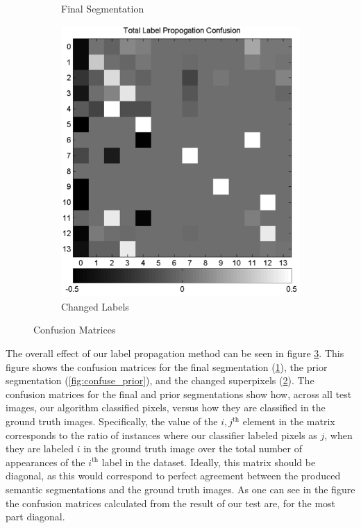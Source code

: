 \documentclass{article} %
\begin{document}
\begin{figure}[htb]
\begin{subfigure}[t]{0.33\textwidth}
		\parbox{0.95\textwidth}{\caption{Final Segmentation \label{fig:confuse_final}}}
	\end{subfigure}
	\begin{subfigure}[t]{0.33\textwidth}
		\centering
		\includegraphics[width = \textwidth]{./img/changeconfuse}
		\parbox{0.95\textwidth}{\caption{Changed Labels \label{fig:confuse_change}}}
	\end{subfigure}
	\caption{Confusion Matrices}
	\label{fig:confuse}
\end{figure}

The overall effect of our label propagation method can be seen in figure \ref{fig:confuse}. This figure shows the confusion matrices for the final segmentation (\ref{fig:confuse_final}), the prior segmentation (\ref{fig:confuse_prior}), and the changed superpixels (\ref{fig:confuse_change}). The confusion matrices for the final and prior segmentations show how, across all test images, our algorithm classified pixels, versus how they are classified in the ground truth images. Specifically, the value  of the $i,j^\textrm{th}$ element in the matrix corresponds to the ratio of instances where our classifier labeled pixels as $j$, when they are labeled $i$ in the ground truth image over the total number of appearances of the $i^\textrm{th}$ label in the dataset. Ideally, this matrix should be diagonal, as this would correspond to perfect agreement between the produced semantic segmentations and the ground truth images. As one can see in the figure the confusion matrices calculated from the result of our test are, for the most part diagonal. 
\end{document}
